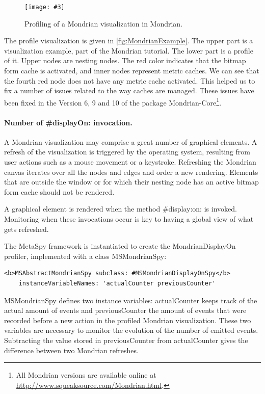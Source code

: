 \documentclass[runningheads]{llncs}
\newcommand{\project}{{\sc MetaSpy}\xspace}
\newcommand{\fig}[4]{
    \begin{figure}[#1]
        \centering
        \texttt{[image: \#3]}
        \caption{\label{fig:#3}#4}
    \end{figure}}
\newcommand{\co}[1]{{\sf #1}}
\begin{document}
\fig{}{.8}{MondrianExample}{Profiling of a Mondrian visualization in Mondrian.}

The profile visualization is given in \autoref{fig:MondrianExample}. The upper part is a visualization example, part of the Mondrian tutorial. The lower part is a profile of it. Upper nodes are nesting nodes. The red color indicates that the bitmap form cache is activated, and inner nodes represent metric caches. We can see that the fourth red node does not have any metric cache activated. This helped us to fix a number of issues related to the way caches are managed. These issues have been fixed in the Version 6, 9 and 10 of the package Mondrian-Core\footnote{All Mondrian versions are available online at \url{http://www.squeaksource.com/Mondrian.html}.}.


\paragraph{Number of \co{\#displayOn:} invocation.}
A Mondrian visualization may comprise a great number of graphical elements. A refresh of the visualization is triggered by the operating system, resulting from user actions such as a mouse movement or a keystroke. Refreshing the Mondrian canvas iterates over all the nodes and edges and order a new rendering. Elements that are outside the window or for which their nesting node has an active bitmap form cache should not be rendered. 

A graphical element is rendered when the method \co{\#display:on:} is invoked. Monitoring when these invocations occur is key to having a global view of what gets refreshed. 

The \project framework is instantiated to create the {\sc MondrianDisplayOn} profiler, implemented with a class \co{\sf MSMondrianSpy}:

\begin{lstlisting}
<b>MSAbstractMondrianSpy subclass: #MSMondrianDisplayOnSpy</b>
    instanceVariableNames: 'actualCounter previousCounter'
\end{lstlisting}

{\sf MSMondrianSpy} defines two instance variables: {\sf actualCounter} keeps track of the actual amount of events and {\sf previousCounter} the amount of events that were recorded before a new action in the profiled Mondrian visualization. These two variables are necessary to monitor the evolution of the number of emitted events.
Subtracting the value stored in {\sf previousCounter} from {\sf actualCounter} gives the difference between two Mondrian refreshes.
\end{document}
